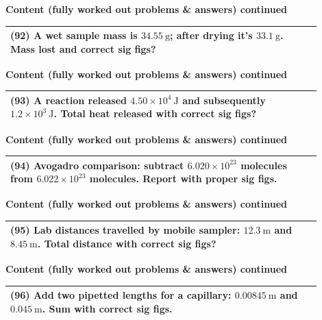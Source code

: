 \documentclass{article}
\begin{document}
\noindent
{\large \textbf{Content (fully worked out problems \& answers) continued}} \\[0.2em]
\begin{tabular}{|p{0.9\linewidth}|}
\hline
\vspace{0.2cm}
\textbf{(92)} A wet sample mass is $34.55~\text{g}$; after drying it's $33.1~\text{g}$. Mass lost and correct sig figs? \\
\hline
\end{tabular}
\newpage

\noindent
{\large \textbf{Content (fully worked out problems \& answers) continued}} \\[0.2em]
\begin{tabular}{|p{0.9\linewidth}|}
\hline
\vspace{0.2cm}
\textbf{(93)} A reaction released $4.50\times10^{4}~\text{J}$ and subsequently $1.2\times10^{3}~\text{J}$. Total heat released with correct sig figs? \\
\hline
\end{tabular}
\newpage

\noindent
{\large \textbf{Content (fully worked out problems \& answers) continued}} \\[0.2em]
\begin{tabular}{|p{0.9\linewidth}|}
\hline
\vspace{0.2cm}
\textbf{(94)} Avogadro comparison: subtract $6.020\times10^{23}$ molecules from $6.022\times10^{23}$ molecules. Report with proper sig figs. \\
\hline
\end{tabular}
\newpage

\noindent
{\large \textbf{Content (fully worked out problems \& answers) continued}} \\[0.2em]
\begin{tabular}{|p{0.9\linewidth}|}
\hline
\vspace{0.2cm}
\textbf{(95)} Lab distances travelled by mobile sampler: $12.3~\text{m}$ and $8.45~\text{m}$. Total distance with correct sig figs? \\
\hline
\end{tabular}
\newpage

\noindent
{\large \textbf{Content (fully worked out problems \& answers) continued}} \\[0.2em]
\begin{tabular}{|p{0.9\linewidth}|}
\hline
\vspace{0.2cm}
\textbf{(96)} Add two pipetted lengths for a capillary: $0.00845~\text{m}$ and $0.045~\text{m}$. Sum with correct sig figs. \\
\hline
\end{tabular}
\newpage
\end{document}
